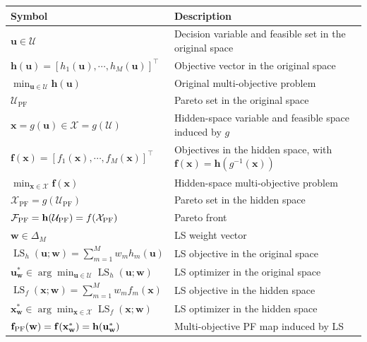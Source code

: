 \documentclass{article}
\newcommand{\bx}{\mathbf{x}}
\newcommand{\bw}{\mathbf{w}}
\newcommand{\bu}{\mathbf{u}}
\newcommand{\X}{\mathcal{X}}
\newcommand{\U}{\mathcal{U}}
\newcommand{\LS}{\operatorname{LS}}
\newcommand{\f}{\mathbf{f}}
\newcommand{\h}{\mathbf{h}}
\newcommand{\fPF}{{\mathbf{f}_{\rm PF}}}
\begin{document}
\begin{table}[tbh]
\centering
\begin{tabular*}{0.98\textwidth}{@{\extracolsep{\fill}} l p{}}
\toprule
Symbol & Description \\
\midrule
$\bu \in \U$
& Decision variable and feasible set in the original space \\

$\h(\bu) = [h_1(\bu),\cdots,h_M(\bu)]^\top$
& Objective vector in the original space \\

$\min_{\bu \in \U} \h(\bu)$
& Original multi-objective problem \\

$\U_{\mathrm{PF}}$
& Pareto set in the original space \\

$\bx = g(\bu) \in \X = g(\U)$
& Hidden-space variable and feasible space induced by $g$ \\

$\mathbf{f}(\bx) = [f_1(\bx),\cdots,f_M(\bx)]^\top$
& Objectives in the hidden space, with $\f(\bx)=\h(g^{-1}(\bx))$ \\

$\min_{\bx \in \X} \mathbf{f}(\bx)$
& Hidden-space multi-objective problem \\

$\X_{\mathrm{PF}}=g(\U_{\mathrm{PF}})$
& Pareto set in the hidden space \\

$\mathcal{F}_{\mathrm{PF}}=\h(\U_{\rm PF})=f(\X_{\rm PF})$
& Pareto front \\
\midrule

$\mathbf{w} \in \Delta_M$
& LS weight vector \\

$\LS_h(\bu;\bw)=\sum_{m=1}^M w_m h_m(\bu)$
& LS objective in the original space \\

$\bu_{\bw}^* \in \arg\min_{\bu\in\U}\LS_h(\bu;\bw)$
& LS optimizer in the original space \\


$\LS_f(\bx;\bw)=\sum_{m=1}^M w_m f_m(\bx)$
& LS objective in the hidden space \\

$\bx_{\bw}^* \in \arg\min_{\bx\in\X}\LS_f(\bx;\bw)$
& LS optimizer in the hidden space \\

$\fPF(\bw)=\f(\bx_\bw^*)=\h(\bu_\bw^*)$
& Multi-objective PF map induced by LS \\


\end{tabular*}
\end{table}
\end{document}
